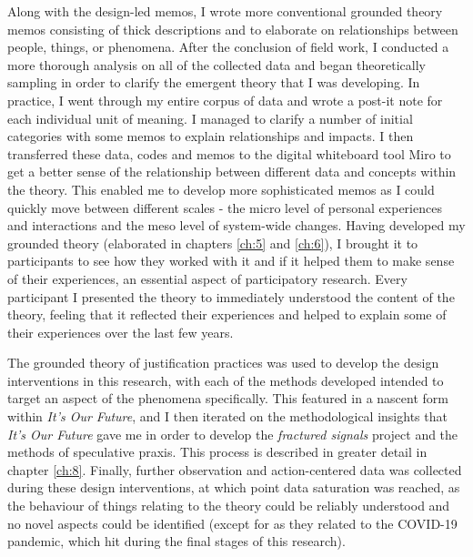 Along with the design-led memos, I wrote more conventional grounded theory memos consisting of thick descriptions and to elaborate on relationships between people, things, or phenomena. After the conclusion of field work, I conducted a more thorough analysis on all of the collected data and began theoretically sampling in order to clarify the emergent theory that I was developing. In practice, I went through my entire corpus of data and wrote a post-it note for each individual unit of meaning. I managed to clarify a number of initial categories with some memos to explain relationships and impacts. I then transferred these data, codes and memos to the digital whiteboard tool Miro to get a better sense of the relationship between different data and concepts within the theory. This enabled me to develop more sophisticated memos as I could quickly move between different scales - the micro level of personal experiences and interactions and the meso level of system-wide changes. Having developed my grounded theory (elaborated in chapters \ref{ch:5} and \ref{ch:6}), I brought it to participants to see how they worked with it and if it helped them to make sense of their experiences, an essential aspect of participatory research. Every participant I presented the theory to immediately understood the content of the theory, feeling that it reflected their experiences and helped to explain some of their experiences over the last few years.

The grounded theory of justification practices was used to develop the design interventions in this research, with each of the methods developed intended to target an aspect of the phenomena specifically. This featured in a nascent form within \emph{It's Our Future}, and I then iterated on the methodological insights that \emph{It's Our Future} gave me in order to develop the \emph{fractured signals} project and the methods of speculative praxis. This process is described in greater detail in chapter \ref{ch:8}. Finally, further observation and action-centered data was collected during these design interventions, at which point data saturation was reached, as the behaviour of things relating to the theory could be reliably understood and no novel aspects could be identified (except for as they related to the COVID-19 pandemic, which hit during the final stages of this research). 





